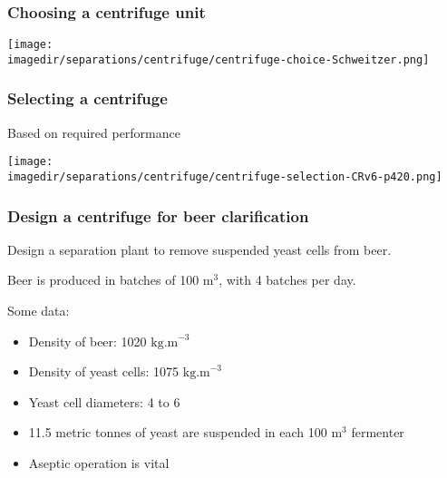 \begin{frame}\frametitle{Choosing a centrifuge unit}
	\begin{center}
		\texttt{[image: \\imagedir/separations/centrifuge/centrifuge-choice-Schweitzer.png]}
	\end{center}
\end{frame}

\begin{frame}\frametitle{Selecting a centrifuge}
	Based on required performance
	\begin{center}
		\texttt{[image: \\imagedir/separations/centrifuge/centrifuge-selection-CRv6-p420.png]}
	\end{center}
\end{frame}

\begin{frame}\frametitle{Design a centrifuge for beer clarification}
	Design a separation plant to remove suspended yeast cells from beer.

	\vspace{12pt}
	Beer is produced in batches of 100 $\text{m}^3$, with 4 batches per day.

	\vspace{12pt}
	Some data:
	\begin{itemize}
		\item	Density of beer: 1020 $\text{kg.m}^{-3}$
		\item	Density of yeast cells: 1075 $\text{kg.m}^{-3}$
		\item	Yeast cell diameters: 4 to 6 \micron
		\item	11.5 metric tonnes of yeast are suspended in each 100 $\text{m}^3$ fermenter
		\item	Aseptic operation is vital
	\end{itemize}
\end{frame}

